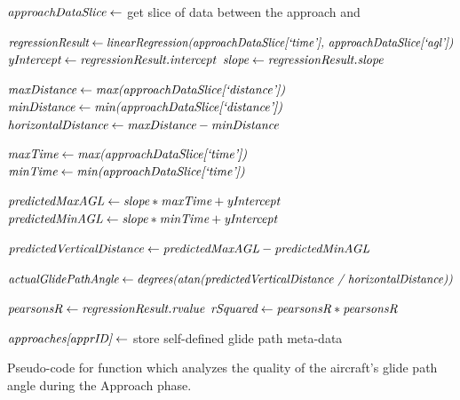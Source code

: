             
            \begin{algorithm}[t]
                \begin{algorithmic}[1]\raggedright
                    \State $ \textit{approachDataSlice} \gets $ get slice of data between the approach  and 
                    
                    \State $ \var{regressionResult} \gets \var{linearRegression(} \break \var{approachDataSlice[`time'], approachDataSlice[`agl'])} $
                    \State $ \textit{yIntercept} \gets \textit{regressionResult.intercept} $
                    \State $ \textit{slope} \gets \textit{regressionResult.slope} $
                    
                    \State $ \textit{maxDistance} \gets \textit{max(approachDataSlice[`distance'])} $
                    \State $ \textit{minDistance} \gets \textit{min(approachDataSlice[`distance'])} $
                    \State $ \textit{horizontalDistance} \gets \textit{maxDistance} - \textit{minDistance} $
                    
                    \State $ \textit{maxTime} \gets \textit{max(approachDataSlice[`time'])} $
                    \State $ \textit{minTime} \gets \textit{min(approachDataSlice[`time'])} $
                    
                    \State $ \textit{predictedMaxAGL} \gets \textit{slope} * \textit{maxTime} + \textit{yIntercept} $
                    \State $ \textit{predictedMinAGL} \gets \textit{slope} * \textit{minTime} + \textit{yIntercept} $
                    
                    \State $ \textit{predictedVerticalDistance} \gets \textit{predictedMaxAGL} - \textit{predictedMinAGL} $
                    
                    \State $ \var{actualGlidePathAngle} \gets \var{degrees(} \break \var{atan(predictedVerticalDistance / horizontalDistance))} $
                    
                    \State $ \textit{pearsonsR} \gets \textit{regressionResult.rvalue} $
                    \State $ \textit{rSquared} \gets \textit{pearsonsR} * \textit{pearsonsR} $
                    
                    \State $ \textit{approaches[apprID]} \gets $ store self-defined glide path meta-data
                    \State \Return {}
                \EndFunction
                \end{algorithmic}
                \caption{Pseudo-code for function which analyzes the quality of the aircraft's glide path angle during the Approach phase.}
                \label{alg:analyze_glide_path}
            \end{algorithm}
    
